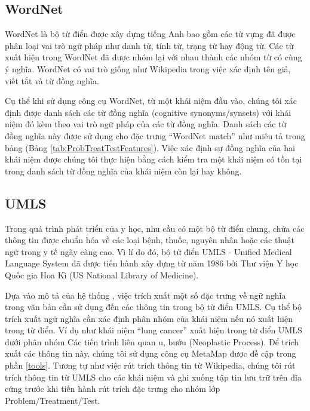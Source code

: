 \subsection*{WordNet}
WordNet là bộ từ điển được xây dựng tiếng Anh bao gồm các từ vựng đã được phân loại vai trò ngữ pháp như danh từ, tính từ, trạng từ hay động từ. Các từ xuất hiện trong WordNet đã được nhóm lại với nhau thành các nhóm từ có cùng ý nghĩa. WordNet có vai trò giống như Wikipedia trong việc xác định tên giả, viết tắt và từ đồng nghĩa.

Cụ thể khi sử dụng công cụ WordNet, từ một khái niệm đầu vào, chúng tôi xác định được danh sách các từ đồng nghĩa (cognitive synonyms/synsets) với khái niệm đó kèm theo vai trò ngữ pháp của các từ đồng nghĩa. Danh sách các từ đồng nghĩa này được sử dụng cho đặc trưng ``WordNet match'' như miêu tả trong bảng (Bảng \ref{tab:ProbTreatTestFeatures}). Việc xác định sự đồng nghĩa của hai khái niệm được chúng tôi thực hiện bằng cách kiểm tra một khái niệm có tồn tại trong danh sách từ đồng nghĩa của khái niệm còn lại hay không.

\subsection*{UMLS}
Trong quá trình phát triển của y học, nhu cầu có một bộ từ điển chung, chứa các thông tin được chuẩn hóa về các loại bệnh, thuốc, nguyên nhân hoặc các thuật ngữ trong y tế ngày càng cao. Vì lí do đó, bộ từ điển UMLS - Unified Medical Language System đã được tiến hành xây dựng từ năm 1986 bởi Thư viện Y học Quốc gia Hoa Kì (US National Library of Medicine).

Dựa vào mô tả của hệ thống \cite{YanXu2012}, việc trích xuất một số đặc trưng về ngữ nghĩa trong văn bản cần sử dụng đến các thông tin trong bộ từ điển UMLS. Cụ thể bộ trích xuất ngữ nghĩa cần xác định phân nhóm của khái niệm nếu nó xuất hiện trong từ điển. Ví dụ như khái niệm ``lung cancer'' xuất hiện trong từ điển UMLS dưới phân nhóm Các tiến trình liên quan u, bướu (Neoplastic Process). Để trích xuất các thông tin này, chúng tôi sử dụng công cụ MetaMap được đề cập trong phần \ref{tools}. Tương tự như việc rút trích thông tin từ Wikipedia, chúng tôi rút trích thông tin từ UMLS cho các khái niệm và ghi xuống tập tin lưu trữ trên đĩa cứng trước khi tiến hành rút trích đặc trưng cho nhóm lớp Problem/Treatment/Test.

